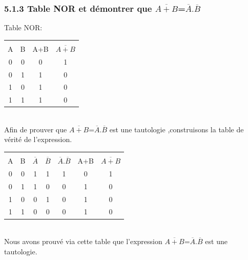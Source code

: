 \documentclass{report}
\begin{document}
\subsubsection*{5.1.3 Table NOR et démontrer que $\overline{A+B}$=$\overline{A}.\overline{B}$}

\hspace{1,5cm}Table NOR: \\

\begin{tabular}{|c|c|c|c|}
\hline
 & & & \\
 A & B & A+B & $\overline{A+B}$\\
 \hline
 0 & 0 & 0 & 1\\
 0 & 1 & 1 & 0\\
 1 & 0 & 1 & 0\\
 1 & 1 & 1 & 0 \\
 \hline
\end{tabular}\\

\hspace*{1,5cm}Afin de prouver que $\overline{A+B}$=$\overline{A}.\overline{B}$ est une tautologie ,construisons la table de v\'erit\'e de l'expression.\\

\begin{tabular}{|c|c|c|c|c|c|c|}
\hline
 & & & & & & \\ 
A & B & $\overline{A}$ & $\overline{B}$ & $\overline{A}$.$\overline{B}$ & A+B & $\overline{A+B}$ \\
\hline
0&0&1&1&1&0&1\\
0&1&1&0&0&1&0\\
1&0&0&1&0&1&0\\
1&1&0&0&0&1&0\\
\hline
\end{tabular}\\

\hspace*{1,5cm} Nous avons prouv\'e via cette table que l'expression $\overline{A+B}$=$\overline{A}.\overline{B}$ est une tautologie.\\
\newpage
\end{document}
